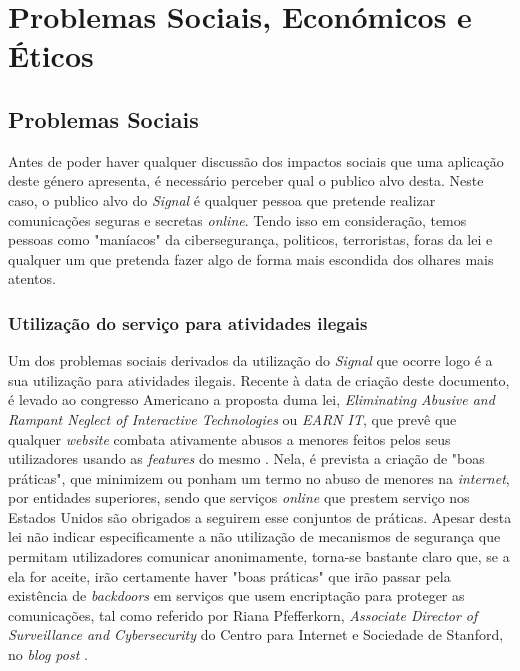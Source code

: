 \section{Problemas Sociais, Económicos e Éticos}

\subsection{Problemas Sociais}
Antes de poder haver qualquer discussão dos impactos sociais que uma aplicação deste género apresenta, é necessário perceber qual o publico alvo desta. Neste caso, o publico alvo do \textit{Signal} é qualquer pessoa que pretende realizar comunicações seguras e secretas \textit{online}. Tendo isso em consideração, temos pessoas como "maníacos" da cibersegurança, politicos, terroristas, foras da lei e qualquer um que pretenda fazer algo de forma mais escondida dos olhares mais atentos.

\subsubsection{Utilização do serviço para atividades ilegais}
Um dos problemas sociais derivados da utilização do \textit{Signal} que ocorre logo é a sua utilização para atividades ilegais. Recente à data de criação deste documento, é levado ao congresso Americano a proposta duma lei, \textit{Eliminating Abusive and Rampant Neglect of Interactive Technologies} ou \textit{EARN IT}, que prevê que qualquer \textit{website} combata ativamente abusos a menores feitos pelos seus utilizadores usando as \textit{features} do mesmo \cite{senate_earn_it}. Nela, é prevista a criação de "boas práticas", que minimizem ou ponham um termo no abuso de menores na \textit{internet}, por entidades superiores, sendo que serviços \textit{online} que prestem serviço nos Estados Unidos são obrigados a seguirem esse conjuntos de práticas. Apesar desta lei não indicar especificamente a não utilização de mecanismos de segurança que permitam utilizadores comunicar anonimamente, torna-se bastante claro que, se a ela for aceite, irão certamente haver "boas práticas" que irão passar pela existência de \textit{backdoors} em serviços que usem encriptação para proteger as comunicações, tal como referido por Riana Pfefferkorn, \textit{Associate Director of Surveillance and Cybersecurity} do Centro para Internet e Sociedade de Stanford, no \textit{blog post} \cite{stanford_cis}.

